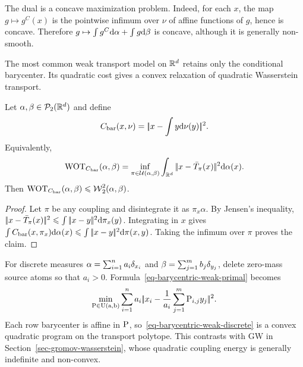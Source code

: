 The dual is a concave maximization problem. Indeed, for each $x$, the map $g\mapsto g^C(x)$ is the pointwise infimum over $\nu$ of affine functions of $g$, hence is concave. Therefore $g\mapsto\int g^C\d\alpha+\int g\d\beta$ is concave, although it is generally non-smooth.

The most common weak transport model on $\RR^d$ retains only the conditional barycenter. Its quadratic cost gives a convex relaxation of quadratic Wasserstein transport.

\begin{prop}\label{prop-barycentric-weak-ot}
	Let $\alpha,\beta\in\Pp_2(\RR^d)$ and define
	\[
		C_{\mathrm{bar}}(x,\nu)
		=
		\norm{x-\int y\d\nu(y)}^2.
	\]
	Equivalently,
	\begin{equation}\label{eq-barycentric-weak-primal}
		\WOT_{C_{\mathrm{bar}}}(\alpha,\beta)
		=
		\inf_{\pi\in\Couplings(\alpha,\beta)}
		\int_{\RR^d}\norm{x-\bar T_\pi(x)}^2\d\alpha(x).
	\end{equation}
	Then
	$\WOT_{C_{\mathrm{bar}}}(\alpha,\beta) \leq \Wass_2^2(\alpha,\beta)$.
\end{prop}

\begin{proof}
	Let $\pi$ be any coupling and disintegrate it as $\pi_x\alpha$. By Jensen's inequality,
	$\norm{x-\bar T_\pi(x)}^2 \leq \int\norm{x-y}^2\d\pi_x(y)$.
	Integrating in $x$ gives $\int C_{\mathrm{bar}}(x,\pi_x)\d\alpha(x)\leq\int\norm{x-y}^2\d\pi(x,y)$. Taking the infimum over $\pi$ proves the claim.
\end{proof}

For discrete measures $\alpha=\sum_{i=1}^n a_i\de_{x_i}$ and $\beta=\sum_{j=1}^m b_j\de_{y_j}$, delete zero-mass source atoms so that $a_i>0$. Formula~\eqref{eq-barycentric-weak-primal} becomes
\begin{equation}\label{eq-barycentric-weak-discrete}
	\min_{\P\in\CouplingsD(\a,\b)}
	\sum_{i=1}^n a_i
	\norm{x_i-\frac{1}{a_i}\sum_{j=1}^m\P_{i,j}y_j}^2.
\end{equation}
Each row barycenter is affine in $\P$, so~\eqref{eq-barycentric-weak-discrete} is a convex quadratic program on the transport polytope. This contrasts with GW in Section~\ref{sec-gromov-wasserstein}, whose quadratic coupling energy is generally indefinite and non-convex.

